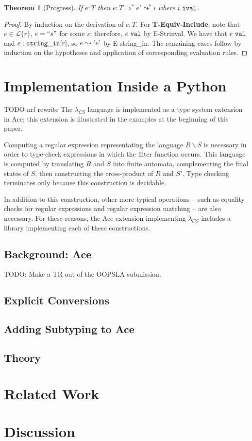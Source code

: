 \documentclass[10pt,preprint]{sigplanconf}
\newtheorem{thm}{Theorem}
\theoremstyle{definition}
\newcommand{\Lagr}{\mathcal{L}}
\newcommand{\strin}{{\tt string\_in}}
\newcommand{\lang}[1]{\Lagr\{#1\}}
\newcommand{\reduces}{ \Rightarrow }
\newcommand{\ireduces}{ \leadsto }
\newcommand{\val}{ \ {\tt val} }
\newcommand{\ival}{ \ {\tt ival} }
\newcommand{\istrf}[1]{`#1\textrm'} %
\newcommand{\strf}[1]{``#1"}
\newcommand{\lcs}{\lambda_{CS}}
\begin{document}
\begin{thm}[Progress]
  If $e:T$ then $e:T \reduces^* e' \ireduces^* i$ where $i \ival$.
\end{thm}
\begin{proof}
By induction on the derivation of $e:T$.
For \textbf{T-Equiv-Include}, note that $e \in \lang{r}$, $e = \strf{s}$ for some $s$; therefore, $e \val$ by E-Strinval. 
We have that $e \val$ and $e : \strin[r]$, so $e \ireduces \istrf{e}$ by E-string\_in.
The remaining cases follow by induction on the hypotheses and application of corresponding evaluation rules.
\end{proof}

\section{Implementation Inside a Python}

TODO-nrf rewrite
The $\lcs$ language is implemented as a type system extension in Ace; this extension
is illustrated in the examples at the beginning of this paper.

Computing a regular expression representating the language
$R \backslash S$ is necessary in order to type-check expressions in which the filter function
occurs. This language is computed by translating $R$ and $S$ into finite automata,
complementing the final states of $S$, then constructing the cross-product of $R$
and $S'$. Type checking terminates only because this construction is decidable.

In addition to this construction, other more typical operations -- such
as equality checks for regular expressions and regular expression matching -- are
also necessary. For these reasons, the Ace extension implementing $\lcs$ includes a library
implementing each of these constructions.

\subsection{Background: Ace}
TODO: Make a TR out of the OOPSLA submission.
\subsection{Explicit Conversions}
\subsection{Adding Subtyping to Ace}
\subsection{Theory}

\section{Related Work}

\section{Discussion}






\end{document}
